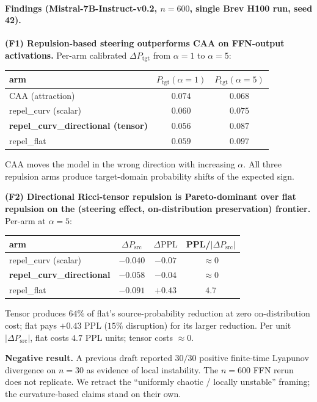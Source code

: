 \documentclass[10pt,twocolumn]{article}
\begin{document}
\paragraph{Findings (Mistral-7B-Instruct-v0.2, $n{=}600$, single Brev H100 run, seed 42).}

\textbf{(F1) Repulsion-based steering outperforms CAA on FFN-output activations.} Per-arm calibrated $\Delta P_{\text{tgt}}$ from $\alpha{=}1$ to $\alpha{=}5$:
\begin{center}\small
\begin{tabular}{lcc}
\toprule
arm & $P_{\text{tgt}}(\alpha{=}1)$ & $P_{\text{tgt}}(\alpha{=}5)$ \\
\midrule
CAA (attraction)               & $0.074$ & $0.068$ \\
repel\_curv (scalar)           & $0.060$ & $0.075$ \\
\textbf{repel\_curv\_directional (tensor)} & $0.056$ & $0.087$ \\
repel\_flat                    & $0.059$ & $0.097$ \\
\bottomrule
\end{tabular}
\end{center}
CAA moves the model in the wrong direction with increasing $\alpha$. All three repulsion arms produce target-domain probability shifts of the expected sign.

\textbf{(F2) Directional Ricci-tensor repulsion is Pareto-dominant over flat repulsion on the (steering effect, on-distribution preservation) frontier.} Per-arm at $\alpha{=}5$:
\begin{center}\small
\begin{tabular}{lccc}
\toprule
arm & $\Delta P_{\text{src}}$ & $\Delta\text{PPL}$ & PPL/$|\Delta P_{\text{src}}|$ \\
\midrule
repel\_curv (scalar)           & $-0.040$ & $-0.07$ & $\approx 0$ \\
\textbf{repel\_curv\_directional} & $-0.058$ & $-0.04$ & $\approx 0$ \\
repel\_flat                    & $-0.091$ & $+0.43$ & $4.7$ \\
\bottomrule
\end{tabular}
\end{center}
Tensor produces $64\%$ of flat's source-probability reduction at zero on-distribution cost; flat pays $+0.43$ PPL ($15\%$ disruption) for its larger reduction. Per unit $|\Delta P_{\text{src}}|$, flat costs $4.7$ PPL units; tensor costs ${\approx}0$.

\textbf{Negative result.} A previous draft reported $30/30$ positive finite-time Lyapunov divergence on $n{=}30$ as evidence of local instability. The $n{=}600$ FFN rerun does not replicate. We retract the ``uniformly chaotic / locally unstable'' framing; the curvature-based claims stand on their own.
\end{document}
